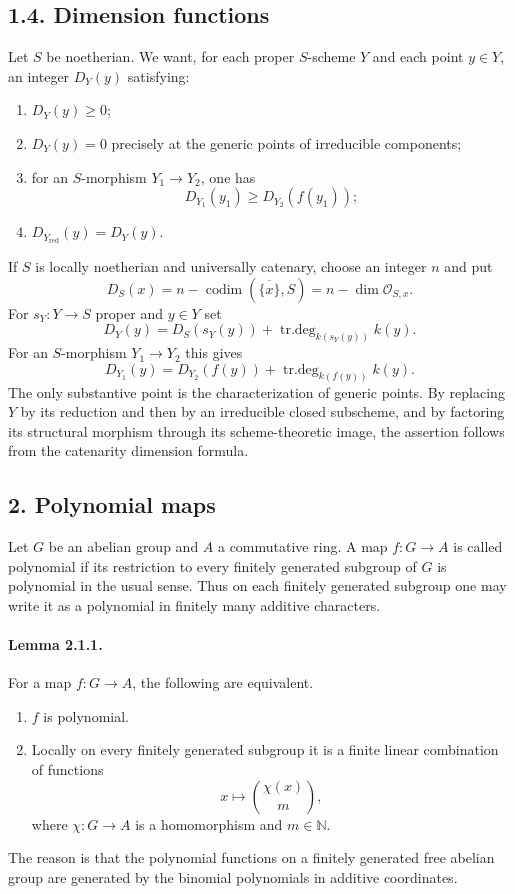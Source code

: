 \documentclass[12pt]{article}
\newcommand{\NN}{\mathbb N}
\newcommand{\cO}{\mathcal O}
\newcommand{\codim}{\operatorname{codim}}
\newcommand{\trdeg}{\operatorname{tr.deg}}
\begin{document}
\subsection*{1.4. Dimension functions}

Let $S$ be noetherian. We want, for each proper $S$-scheme $Y$ and each point $y\in Y$, an integer $D_Y(y)$ satisfying:
\begin{enumerate}[label=\roman*)]
\item $D_Y(y)\geq0$;
\item $D_Y(y)=0$ precisely at the generic points of irreducible components;
\item for an $S$-morphism $Y_1\to Y_2$, one has
\[
D_{Y_1}(y_1)\geq D_{Y_2}(f(y_1));
\]
\item $D_{Y_{\mathrm{red}}}(y)=D_Y(y)$.
\end{enumerate}

If $S$ is locally noetherian and universally catenary, choose an integer $n$ and put
\[
D_S(x)=n-\codim(\overline{\{x\}},S)=n-\dim \cO_{S,x}.
\]
For $s_Y:Y\to S$ proper and $y\in Y$ set
\[
D_Y(y)=D_S(s_Y(y))+\trdeg_{k(s_Y(y))}k(y).
\]
For an $S$-morphism $Y_1\to Y_2$ this gives
\[
D_{Y_1}(y)=D_{Y_2}(f(y))+\trdeg_{k(f(y))}k(y).
\]
The only substantive point is the characterization of generic points. By replacing $Y$ by its reduction and then by an irreducible closed subscheme, and by factoring its structural morphism through its scheme-theoretic image, the assertion follows from the catenarity dimension formula.

\subsection*{2. Polynomial maps}

Let $G$ be an abelian group and $A$ a commutative ring. A map $f:G\to A$ is called polynomial if its restriction to every finitely generated subgroup of $G$ is polynomial in the usual sense. Thus on each finitely generated subgroup one may write it as a polynomial in finitely many additive characters.

\paragraph{Lemma 2.1.1.}
For a map $f:G\to A$, the following are equivalent.
\begin{enumerate}[label=\roman*)]
\item $f$ is polynomial.
\item Locally on every finitely generated subgroup it is a finite linear combination of functions
\[
x\longmapsto {\chi(x)\choose m},
\]
where $\chi:G\to A$ is a homomorphism and $m\in\NN$.
\end{enumerate}
The reason is that the polynomial functions on a finitely generated free abelian group are generated by the binomial polynomials in additive coordinates.
\end{document}
